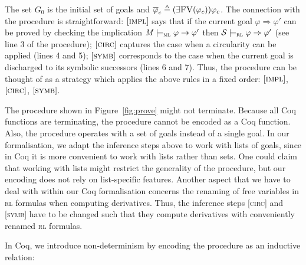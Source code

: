 \documentclass[conference]{IEEEtran}
\newenvironment{todo}{\medskip\hrule\smallskip\noindent}{\smallskip\hrule\medskip}
\newcommand{\vr}[1]{\begin{todo}\textcolor{blue}{Vlad:}\\ \color{orange}{#1}\color{black}\end{todo}}
\newcommand{\vr}[1]{}
\newcommand{\M}{\mathit{M}}
\newcommand{\eqbydef}{\triangleq}
\renewcommand{\S}{\mathcal{S}}
\newcommand{\Ra}{\Rightarrow}
\newcommand{\FreeVars}{\mathit{\textsc{FV}}}
\renewcommand{\implies}{\rightarrow}
\newcommand{\ML}{\textsc{ml}\xspace}
\newcommand{\RL}{\textsc{rl}\xspace}
\newcommand{\rrule}[2]{{#1} \Ra{#2}}
\newcommand{\modelsml}{\models_\ML}
\newcommand{\modelsrl}{\models_\RL}
\begin{document}
\noindent
The set $G_0$ is the initial set of goals and $\overline{\varphi}_{c} \eqbydef (\exists \FreeVars(\varphi_c))\varphi_c$. 
The connection with the procedure is straightforward:
 $[\textsc{impl}]$ says that if the current goal $ \rrule{\varphi}{\varphi'}$ can be proved by checking the implication $\M\modelsml \varphi \implies \varphi'$ then $\S \modelsrl \rrule{\varphi}{\varphi'}$ (see line 3 of the procedure); $[\textsc{circ}]$ captures the case when a circularity can be applied (lines 4 and 5); $[\textsc{symb}]$ corresponds to the case when the current goal is discharged to its symbolic successors (lines 6 and 7).
Thus, the procedure can be thought of as a strategy which applies the above rules in a fixed order: $[\textsc{impl}]$, $[\textsc{circ}]$, $[\textsc{symb}]$.

 
The procedure shown in Figure~\ref{fig:prove} might not terminate.
Because all Coq functions are terminating, the procedure cannot be encoded as a Coq function.
Also, the procedure operates with a set of goals instead of a single goal.
In our formalisation, we adapt the inference steps above to work with lists of goals, since in Coq it is more convenient to work with lists rather than sets.
One could claim that working with lists might restrict the generality of the procedure, but our encoding does not rely on list-specific features.
Another aspect that we have to deal with within our Coq formalisation concerns the renaming of free variables in \RL formulas when computing derivatives. 
Thus,  the inference steps [\textsc{circ}] and [\textsc{symb}] have to be changed such that they compute derivatives with conveniently renamed \RL formulas.


In Coq, we introduce non-determinism by encoding the procedure as an inductive relation:\\
\end{document}
